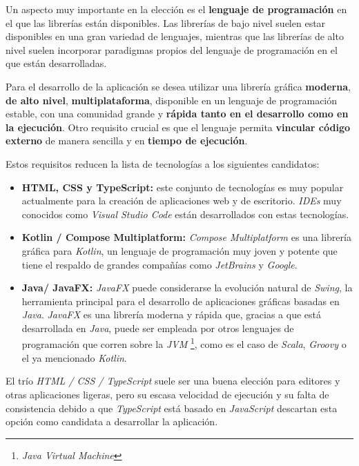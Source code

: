 Un aspecto muy importante en la elección es el \textbf{lenguaje de programación}
en el que las librerías están disponibles.
Las librerías de bajo nivel suelen estar disponibles en una gran variedad de lenguajes, mientras que las
librerías de alto nivel suelen incorporar paradigmas propios del lenguaje de programación en el que están
desarrolladas.

Para el desarrollo de la aplicación se desea utilizar una librería gráfica \textbf{moderna},
\textbf{de alto nivel}, \textbf{multiplataforma}, disponible en un lenguaje de programación estable,
con una comunidad grande y \textbf{rápida tanto en el desarrollo como en la ejecución}.
Otro requisito crucial es que el lenguaje permita \textbf{vincular código externo} de manera
sencilla y en \textbf{tiempo de ejecución}.

Estos requisitos reducen la lista de tecnologías a los siguientes candidatos:
\begin{itemize}
    \item \textbf{HTML, CSS y TypeScript:} este conjunto de tecnologías es muy popular actualmente
    para la creación de aplicaciones web y de escritorio. \textit{IDEs} muy conocidos como
    \textit{Visual Studio Code} están desarrollados con estas tecnologías.
    \item \textbf{Kotlin / Compose Multiplatform:} \textit{Compose Multiplatform} es una librería gráfica
    para \textit{Kotlin}, un lenguaje de programación muy joven y potente que tiene el respaldo de
    grandes compañías como \textit{JetBrains} y \textit{Google}.
    \item \textbf{Java/ JavaFX:}
    \textit{JavaFX} puede considerarse la evolución natural de \textit{Swing},
    la herramienta principal para el desarrollo de aplicaciones gráficas basadas en \textit{Java}.
    \textit{JavaFX} es una librería moderna y rápida que, gracias a que está desarrollada en \textit{Java},
    puede ser empleada por otros lenguajes de programación que corren sobre la \textit{JVM}
    \footnote{\textit{Java Virtual Machine}}, como es el caso de \textit{Scala}, \textit{Groovy} o el ya mencionado
    \textit{Kotlin}.
\end{itemize}

El trío \textit{HTML / CSS / TypeScript} suele ser una buena elección para
editores y otras aplicaciones ligeras, pero su escasa velocidad de ejecución
y su falta de consistencia debido a que \textit{TypeScript} está basado
en \textit{JavaScript} descartan esta opción como candidata
a desarrollar la aplicación.

